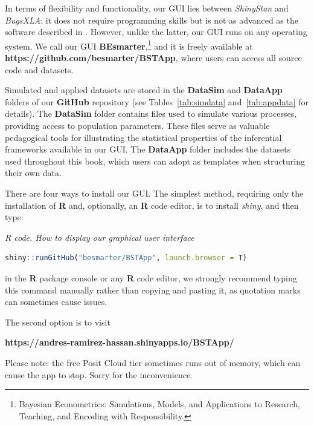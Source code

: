 In terms of flexibility and functionality, our GUI lies between \textit{ShinyStan} and \textit{BugsXLA}: it does not require programming skills but is not as advanced as the software described in \cite{Karabatsos2016}. However, unlike the latter, our GUI runs on any operating system. We call our GUI \textbf{BEsmarter},\footnote{Bayesian Econometrics: Simulations, Models, and Applications to Research, Teaching, and Encoding with Responsibility.} and it is freely available at \textbf{\textbf{https://github.com/besmarter/BSTApp}}, where users can access all source code and datasets.

Simulated and applied datasets are stored in the \textbf{DataSim} and \textbf{DataApp} folders of our \textbf{GitHub} repository (see Tables~\ref{tab:simdata} and~\ref{tab:appdata} for details). The \textbf{DataSim} folder contains files used to simulate various processes, providing access to population parameters. These files serve as valuable pedagogical tools for illustrating the statistical properties of the inferential frameworks available in our GUI. The \textbf{DataApp} folder includes the datasets used throughout this book, which users can adopt as templates when structuring their own data.

There are four ways to install our GUI. The simplest method, requiring only the installation of \textbf{R} and, optionally, an \textbf{R} code editor, is to install \textit{shiny}, and then type:

\begin{tcolorbox}[enhanced,width=4.67in,center upper,
	fontupper=\large\bfseries,drop shadow southwest,sharp corners]
	\textit{R code. How to display our graphical user interface}
	\begin{VF}
		\begin{lstlisting}[language=R]
			shiny::runGitHub("besmarter/BSTApp", launch.browser = T)\end{lstlisting}
	\end{VF}
\end{tcolorbox} 

in the \textbf{R} package console or any \textbf{R} code editor, we strongly recommend typing this command manually rather than copying and pasting it, as quotation marks can sometimes cause issues.

The second option is to visit

\textbf{https://andres-ramirez-hassan.shinyapps.io/BSTApp/}

Please note: the free Posit Cloud tier sometimes runs out of memory, which can cause the app to stop. Sorry for the inconvenience.

